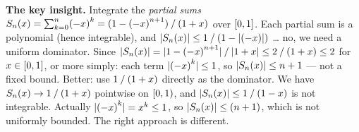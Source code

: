 \documentclass[
]{article}
\begin{document}
\textbf{The key insight.} Integrate the \emph{partial sums}
\(S_{n}\mathopen{\mDelimiter{(}}x\mathclose{\mDelimiter{)}} = \sum_{k={\mNumber{0}}}^{n} \mathopen{\mDelimiter{(}}-x\mathclose{\mDelimiter{)}}^{k} = \mathopen{\mDelimiter{(}}{\mNumber{1}}-\mathopen{\mDelimiter{(}}-x\mathclose{\mDelimiter{)}}^{n+{\mNumber{1}}}\mathclose{\mDelimiter{)}}\mathbin{\mBridgeOperator{/}}\mathopen{\mDelimiter{(}}{\mNumber{1}}+x\mathclose{\mDelimiter{)}}\)
over
\(\mathopen{[}{0},{1}\mathclose{]}\).
Each partial sum is a polynomial (hence integrable), and
\(\mathopen{\mDelimiter{|}}S_{n}\mathopen{\mDelimiter{(}}x\mathclose{\mDelimiter{)}}\mathclose{\mDelimiter{|}} \le {\mNumber{1}}\mathbin{\mBridgeOperator{/}}\mathopen{\mDelimiter{(}}{\mNumber{1}}-\mathopen{\mDelimiter{|}}\mathopen{\mDelimiter{(}}-x\mathclose{\mDelimiter{)}}\mathclose{\mDelimiter{|}}\mathclose{\mDelimiter{)}}\)
\ldots{} no, we need a uniform dominator. Since
\(\mathopen{\mDelimiter{|}}S_{n}\mathopen{\mDelimiter{(}}x\mathclose{\mDelimiter{)}}\mathclose{\mDelimiter{|}} = \mathopen{\mDelimiter{|}}{\mNumber{1}}-\mathopen{\mDelimiter{(}}-x\mathclose{\mDelimiter{)}}^{n+{\mNumber{1}}}\mathclose{\mDelimiter{|}}\mathbin{\mBridgeOperator{/}}\mathopen{\mDelimiter{|}}{\mNumber{1}}+x\mathclose{\mDelimiter{|}} \le {\mNumber{2}}\mathbin{\mBridgeOperator{/}}\mathopen{\mDelimiter{(}}{\mNumber{1}}+x\mathclose{\mDelimiter{)}} \le {\mNumber{2}}\)
for
\(x \in \mathopen{\mDelimiter{[}}{\mNumber{0}},{\mNumber{1}}\mathclose{\mDelimiter{]}}\),
or more simply: each term
\(\mathopen{\mDelimiter{|}}\mathopen{\mDelimiter{(}}-x\mathclose{\mDelimiter{)}}^{k}\mathclose{\mDelimiter{|}} \le {\mNumber{1}}\),
so
\(\mathopen{\mDelimiter{|}}S_{n}\mathopen{\mDelimiter{(}}x\mathclose{\mDelimiter{)}}\mathclose{\mDelimiter{|}} \le n+{\mNumber{1}}\)
--- not a fixed bound. Better: use
\({1}\mathbin{/}\mathopen{(}{1}+x\mathclose{)}\)
directly as the dominator. We have
\(S_{n}\mathopen{\mDelimiter{(}}x\mathclose{\mDelimiter{)}} \to {\mNumber{1}}\mathbin{\mBridgeOperator{/}}\mathopen{\mDelimiter{(}}{\mNumber{1}}+x\mathclose{\mDelimiter{)}}\)
pointwise on
\(\mathopen{[}{0},{1}\mathclose{)}\),
and
\(\mathopen{\mDelimiter{|}}S_{n}\mathopen{\mDelimiter{(}}x\mathclose{\mDelimiter{)}}\mathclose{\mDelimiter{|}} \le {\mNumber{1}}\mathbin{\mBridgeOperator{/}}\mathopen{\mDelimiter{(}}{\mNumber{1}}-x\mathclose{\mDelimiter{)}}\)
is not integrable. Actually
\(\mathopen{\mDelimiter{|}}\mathopen{\mDelimiter{(}}-x\mathclose{\mDelimiter{)}}^{k}\mathclose{\mDelimiter{|}} = x^{k} \le {\mNumber{1}}\),
so
\(\mathopen{\mDelimiter{|}}S_{n}\mathopen{\mDelimiter{(}}x\mathclose{\mDelimiter{)}}\mathclose{\mDelimiter{|}} \le \mathopen{\mDelimiter{(}}n+{\mNumber{1}}\mathclose{\mDelimiter{)}}\),
which is not uniformly bounded. The right approach is different.
\end{document}
